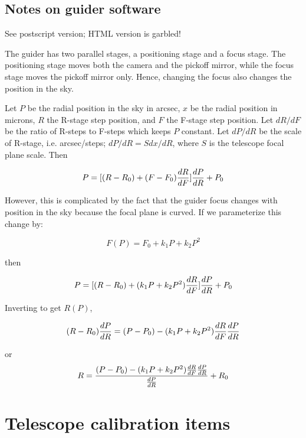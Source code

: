 \documentclass{article}[12pt]
\begin{document}
\subsection{Notes on guider software}
\begin{htmlonly}
See postscript version; HTML version is garbled!
\end{htmlonly}
\begin{latexonly}

The guider has two parallel stages, a positioning stage and a focus stage.
The positioning stage moves both the camera and the pickoff mirror, while
the focus stage moves the pickoff mirror only. Hence, changing the focus
also changes the position in the sky.

Let $P$ be the radial position in the sky in arcsec, $x$ be the radial
position in microns, $R$ the R-stage step position, and
$F$ the F-stage step position. Let $dR/dF$ be the ratio of R-steps to F-steps
which keeps $P$ constant. Let $dP/dR$ be the scale of R-stage, i.e.
arcsec/steps; $dP/dR = S dx/dR$, where $S$ is the telescope focal plane
scale. Then

$$P = [(R-R_0)+(F-F_0){dR\over dF}]{dP\over dR} + P_0$$

However, this is complicated by the fact that the guider focus changes with
position in the sky because the focal plane is curved. If we parameterize
this change by:

$$F(P) = F_0 + k_1 P + k_2 P^2$$ 

then

$$P = [(R-R_0)+(k_1 P + k_2 P^2){dR\over dF}]{dP\over dR} + P_0$$

Inverting to get $R(P)$,

$$(R-R_0) {dP\over dR} = (P - P_0) - (k_1 P + k_2 P^2) {dR\over dF}{dP\over dR}$$

or
$$R = {(P-P_0) - (k_1 P + k_2 P^2) {dR\over dF}{dP\over dR} \over {dP\over dR}} + R_0$$

\end{latexonly}

\section{Telescope calibration items}
\end{document}
